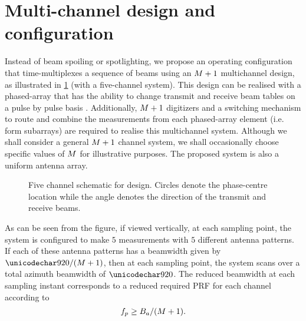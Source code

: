 \section{Multi-channel design and configuration}
\label{sc:multigeometry}
Instead of beam spoiling or spotlighting, we propose an operating configuration that time-multiplexes a sequence of beams using an $M + 1$ multichannel design, as illustrated in \ref{fg:fivechan} (with a five-channel system). This design can be realised with a phased-array that has the ability to change transmit and receive beam tables on a pulse by pulse basis \cite{CalabreseDiego2014, SikanetaGierullTGRS2015}. Additionally, $M + 1$ digitizers and a switching mechanism to route and combine the measurements from each phased-array element (i.e. form subarrays) are required to realise this multichannel system. Although we shall consider a general $M + 1$ channel system, we shall occasionally choose specific values of $M$ for illustrative purposes. The proposed system is also a uniform antenna array.
\begin{figure}[h!]
\begin{center}
 \resizebox{0.8\columnwidth}{!}{}
 \caption{Five channel schematic for design. Circles denote the phase-centre location while the angle denotes the direction of the transmit and receive beams.}
 \label{fg:fivechan}
 \end{center}
\end{figure}
\par
As can be seen from the figure, if viewed vertically, at each sampling point, the system is configured to make $5$ measurements with $5$ different antenna patterns. If each of these antenna patterns has a beamwidth given by $\threeDB/(\channelM + 1)$, then at each sampling point, the system scans over a total azimuth beamwidth of $\threeDB$. The reduced beamwidth at each sampling instant corresponds to a reduced required PRF for each channel according to
\begin{equation}
 f_p \geq B_a/(M + 1).
\end{equation}
